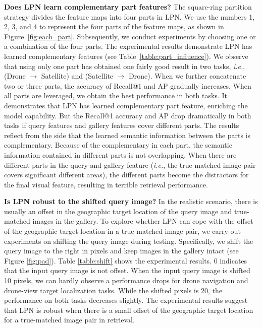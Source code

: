 \documentclass[journal]{IEEEtran}
\def\ie{\emph{i.e.}}
\begin{document}
\textbf{Does LPN learn complementary part features?}
The square-ring partition strategy divides the feature maps into four parts in LPN. We use the numbers 1, 2, 3, and 4 to represent the four parts of the feature maps, as shown in Figure~\ref{fig:each_part}. Subsequently, we conduct experiments by choosing one or a combination of the four parts. The experimental results demonstrate LPN has learned complementary features (see Table~\ref{table:part_influence}). We observe that using only one part has obtained one fairly good result in two tasks, \ie, (Drone $\rightarrow$ Satellite) and (Satellite $\rightarrow$ Drone). When we further concatenate two or three parts, the accuracy of Recall@1 and AP gradually increases. 
When all parts are leveraged, we obtain the best performance in both tasks. It demonstrates that LPN has learned complementary part feature, enriching the model capability. But the Recall@1 accuracy and AP drop dramatically in both tasks if query features and gallery features cover different parts. The results reflect from the side that the learned semantic information between the parts is complementary. Because of the complementary in each part, the semantic information contained in different parts is not overlapping. When there are different parts in the query and gallery feature (\ie, the true-matched image pair covers significant different areas), the different parts become the distractors for the final visual feature, resulting in terrible retrieval performance. 
\par
\textbf{Is LPN robust to the shifted query image?} In the realistic scenario, there is usually an offset in the geographic target location of the query image and true-matched images in the gallery. To explore whether LPN can cope with the offset of the geographic target location in a true-matched image pair, we carry out experiments on shifting the query image during testing. Specifically, we shift the query image to the right in pixels and keep images in the gallery intact (see Figure \ref{fig:pad}). Table \ref{table:shift} shows the experimental results. 0 indicates that the input query image is not offset. When the input query image is shifted 10 pixels, we can hardly observe a performance drops for drone navigation and drone-view target localization tasks. While the shifted pixels is 20, the performance on both tasks decreases slightly. The experimental results suggest that LPN is robust when there is a small offset of the geographic target location for a true-matched image pair in retrieval.
\end{document}

